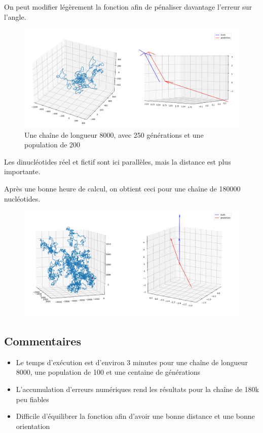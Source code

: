 \documentclass[graphics]{beamer}
\begin{document}
\begin{frame}
	On peut modifier légèrement la fonction  afin de pénaliser davantage l'erreur sur l'angle.
	\begin{figure}[H]
		\centering
		\includegraphics[scale=0.25]{250gen200pop0.3_0.003_0.7_0.003alpha=10}
		\caption{Une chaîne de longueur 8000, avec 250 générations et une population de 200}
	\end{figure}
	Les dinucléotides réel et fictif sont ici parallèles, mais la distance est plus importante.
\end{frame}

\begin{frame}
	Après une bonne heure de calcul, on obtient ceci pour une chaîne de 180000 nucléotides.
	\begin{figure}[H]
		\centering
		\includegraphics[scale=0.25]{180}
	\end{figure}
\end{frame}

\subsection{Commentaires}
	
\begin{frame}
	\begin{itemize}
		\item Le temps d'exécution est d'environ 3 minutes pour une chaîne de longueur 8000, une population de 100 et une centaine de générations
		\item L'accumulation d'erreurs numériques rend les résultats pour la chaîne de 180k peu fiables
		\item Difficile d'équilibrer la fonction  afin d'avoir une bonne distance et une bonne orientation
	\end{itemize}
\end{frame}
\end{document}
